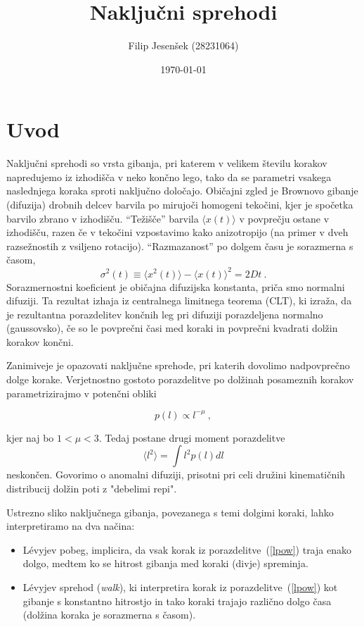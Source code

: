 \documentclass{article}
\title{Naključni sprehodi}
\author{Filip Jesenšek (28231064)}
\date{\today}
\begin{document}
\maketitle

\section{Uvod}
Naključni sprehodi so vrsta gibanja, pri katerem
v velikem številu korakov napredujemo iz izhodišča
v neko končno lego, tako da se parametri vsakega naslednjega
koraka sproti naključno določajo.  Običajni zgled
je Brownovo gibanje (difuzija) drobnih delcev barvila
po mirujoči homogeni tekočini, kjer je spočetka barvilo
zbrano v izhodišču.  ``Težišče'' barvila
$\langle x(t)\rangle$ v povprečju ostane v izhodišču,
razen če v tekočini vzpostavimo kako anizotropijo (na primer
v dveh razsežnostih z vsiljeno rotacijo).  ``Razmazanost''
po dolgem času je sorazmerna s časom,
\begin{equation*}
  \sigma^2(t) \equiv \langle x^2(t)\rangle - \langle x(t)\rangle^2 = 2 D t \>.
\end{equation*}
Sorazmernostni koeficient je običajna difuzijska konstanta,
priča smo normalni difuziji.  Ta rezultat izhaja iz
centralnega limitnega teorema (CLT), ki izraža,
da je rezultantna porazdelitev končnih leg pri difuziji
porazdeljena normalno (gaussovsko), če so le povprečni časi
med koraki in povprečni kvadrati dolžin korakov končni.

Zanimiveje je opazovati naključne sprehode, pri katerih dovolimo
nadpovprečno dolge korake.  Verjetnostno gostoto porazdelitve
po dolžinah posameznih korakov parametrizirajmo v potenčni obliki

\begin{equation}
p(l) \propto l^{-\mu} \>,
\label{lpow}
\end{equation}

kjer naj bo $1 < \mu < 3$.  Tedaj postane drugi moment porazdelitve
\begin{equation*}
  \langle l^2\rangle = \int l^2 p(l) d l
\end{equation*}
neskončen.  Govorimo o anomalni difuziji, prisotni pri celi dru\v zini
kinematičnih distribucij dolžin poti z "debelimi repi".

Ustrezno sliko naključnega gibanja, povezanega s temi dolgimi koraki, lahko
interpretiramo na dva načina:
\begin{itemize}
  \item L\'evyjev pobeg, implicira, da vsak korak iz
  porazdelitve~(\ref{lpow}) traja enako dolgo, medtem ko se hitrost gibanja med koraki (divje) spreminja.
  \item L\'evyjev sprehod ({\sl walk\/}), ki interpretira korak iz porazdelitve~(\ref{lpow}) kot  gibanje s konstantno hitrostjo in
  tako koraki trajajo različno dolgo časa (dolžina koraka je sorazmerna s časom).
\end{itemize}
\end{document}
